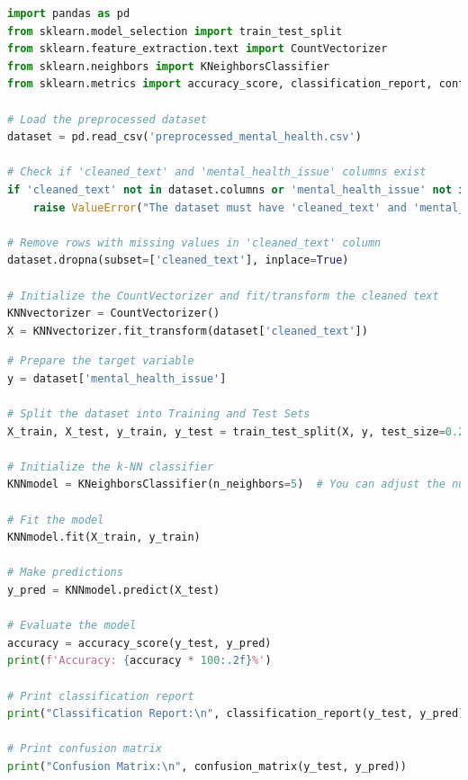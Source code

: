\begin{tcolorbox}[colback=gray!5!white, colframe=gray!80!black, boxrule=0.5pt, title=k-NN Classifier Implementation for Mental Health Classification]
    \begin{lstlisting}[language=Python]
import pandas as pd
from sklearn.model_selection import train_test_split
from sklearn.feature_extraction.text import CountVectorizer
from sklearn.neighbors import KNeighborsClassifier
from sklearn.metrics import accuracy_score, classification_report, confusion_matrix

# Load the preprocessed dataset
dataset = pd.read_csv('preprocessed_mental_health.csv')

# Check if 'cleaned_text' and 'mental_health_issue' columns exist
if 'cleaned_text' not in dataset.columns or 'mental_health_issue' not in dataset.columns:
    raise ValueError("The dataset must have 'cleaned_text' and 'mental_health_issue' columns.")

# Remove rows with missing values in 'cleaned_text' column
dataset.dropna(subset=['cleaned_text'], inplace=True)

# Initialize the CountVectorizer and fit/transform the cleaned text
KNNvectorizer = CountVectorizer()
X = KNNvectorizer.fit_transform(dataset['cleaned_text'])
\end{lstlisting}
\end{tcolorbox}

\begin{tcolorbox}[colback=gray!5!white, colframe=gray!80!black, boxrule=0.5pt, title=k-NN Classifier Implementation for Mental Health Classification]
    \begin{lstlisting}[language=Python]
# Prepare the target variable
y = dataset['mental_health_issue']

# Split the dataset into Training and Test Sets
X_train, X_test, y_train, y_test = train_test_split(X, y, test_size=0.2, random_state=42)

# Initialize the k-NN classifier
KNNmodel = KNeighborsClassifier(n_neighbors=5)  # You can adjust the number of neighbors

# Fit the model
KNNmodel.fit(X_train, y_train)

# Make predictions
y_pred = KNNmodel.predict(X_test)

# Evaluate the model
accuracy = accuracy_score(y_test, y_pred)
print(f'Accuracy: {accuracy * 100:.2f}%')

# Print classification report
print("Classification Report:\n", classification_report(y_test, y_pred))

# Print confusion matrix
print("Confusion Matrix:\n", confusion_matrix(y_test, y_pred))
    \end{lstlisting}
\end{tcolorbox}

